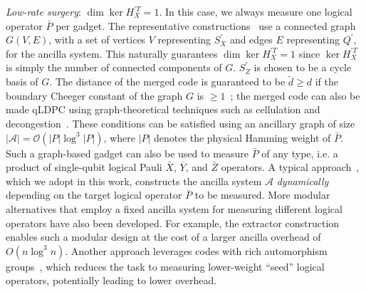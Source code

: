 \documentclass[reprint,twocolumn,secnumarabic,amssymb, aps, prx]{revtex4-2}
\begin{document}
\emph{Low-rate surgery}: $\dim \ker H_X^{\prime T} = 1$. In this case, we always measure one logical operator $\bar{P}$ per gadget. The representative constructions~\cite{cross2024improved, williamson2024low, he2025extractors} use a connected graph $G(V, E)$, with a set of vertices $V$ representing $S_X^{\prime}$ and edges $E$ representing $Q^{\prime}$, for the ancilla system. This naturally guarantees $\dim \ker H_X^{\prime T} = 1$ since $\ker H_X^{\prime T}$ is simply the number of connected components of $G$. $S_Z^{\prime}$ is chosen to be a cycle basis of $G$. The distance of the merged code is guaranteed to be $\tilde{d} \geq d$ if the boundary Cheeger constant of the graph $G$ is $\geq 1$~\cite{swaroop2024universal}; the merged code can also be made qLDPC using graph-theoretical techniques such as cellulation and decongestion~\cite{cross2024improved}. These conditions can be satisfied using an ancillary graph of size \mbox{$|\mathcal{A}| = \mathcal{O}(|P| \log^3 |P|)$}, where $|P|$ denotes the physical Hamming weight of $\bar{P}$. Such a graph-based gadget can also be used to measure $\bar{P}$ of any type, i.e. a product of single-qubit logical Pauli $\bar{X}$, $\overline{Y}$, and $\bar{Z}$ operators. A typical approach~\cite{cross2024improved, williamson2024low}, which we adopt in this work, constructs the ancilla system $\mathcal{A}$ \emph{dynamically} depending on the target logical operator $\bar{P}$ to be measured. More modular alternatives that employ a fixed ancilla system for measuring different logical operators have also been developed. For example, the extractor construction~\cite{he2025extractors} enables such a modular design at the cost of a larger ancilla overhead of $O(n \log^3 n)$. Another approach leverages codes with rich automorphism groups~\cite{cross2024improved, webster2025explicit}, which reduces the task to measuring lower-weight ``seed'' logical operators, potentially leading to lower overhead.
\end{document}
